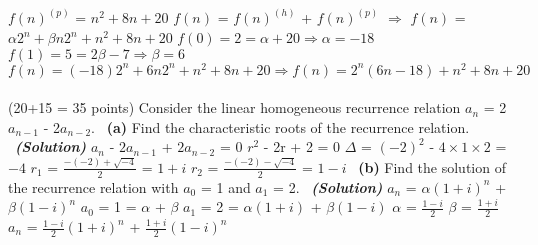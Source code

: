 \documentclass[a4 paper]{article}
\numberwithin{equation}{section}
\newcommand{\problem}[2]{~\\\fbox{\textbf{Problem #1}}\hfill (#2 points)\newline\newline}
\newcommand{\subproblem}[1]{~\newline\textbf{(#1)}}
\newcommand{\solution}{~\newline\textbf{\textit{(Solution)}} }
\newcommand{\0}{\mathbf{0}}
\begin{document}
$f(n)^{(p)}$ = $n^2 + 8n + 20$\newline
$f(n)$ = $f(n)^{(h)}$ + $f(n)^{(p)}$ $\Longrightarrow$ $f(n)$ = $\alpha2^n + \beta n2^n + n^2 + 8n + 20$\newline
$f(0) = 2 = \alpha + 20 \Rightarrow \alpha = -18$\newline
$f(1) = 5 = 2\beta - 7 \Rightarrow \beta = 6$\newline
$f(n) = (-18)2^n + 6n2^n + n^2 + 8n + 20 \Longrightarrow f(n) = 2^n(6n - 18) + n^2 + 8n + 20$\newline
\problem{3}{20+15 = 35}
Consider the linear homogeneous recurrence relation $a_n$ = 2$a_{n-1}$ - 2$a_{n-2}$.
\subproblem{a} Find the characteristic roots of the recurrence relation.
\solution
\newline
$a_n$ - $2a_{n-1}$ + $2a_{n-2}$ = 0\newline
$r^2$ - 2r + 2 = 0\newline
$\Delta$ = $(-2)^2$ - $4\times1\times2$ = $-4$\newline
$r_1$ = $\frac{-(-2) + \sqrt{-4}}{2}$ = $1 + i$\newline
$r_2$ = $\frac{-(-2) - \sqrt{-4}}{2}$ = $1 - i$
\subproblem{b} Find the solution of the recurrence relation with $a_0$ = 1 and $a_1$ = 2.
\solution\newline
$a_n$ = $\alpha(1 + i)^n$ + $\beta(1 - i)^n$\newline
$a_0$ = 1 = $\alpha$ + $\beta$\newline
$a_1$ = 2 = $\alpha(1 + i)$ + $\beta(1 - i)$\newline
$\alpha$ = $\frac{1 - i}{2}$ \quad $\beta$ = $\frac{1 + i}{2}$\newline
$a_n$ = $\frac{1 - i}{2}(1 + i)^n$ + $\frac{1 + i}{2}(1 - i)^n$
\end{document}
